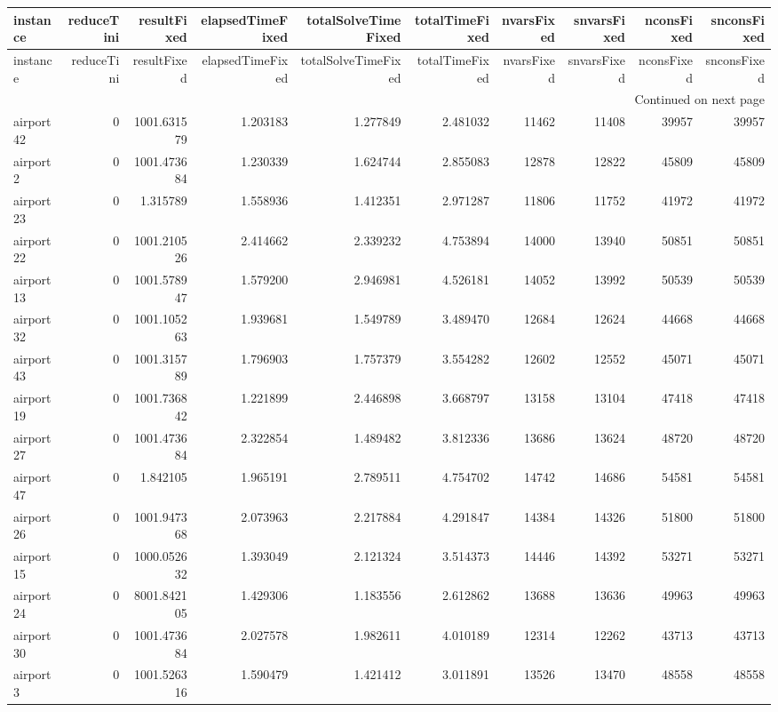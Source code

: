 \begin{longtable}{|l|r|r|r|r|r|r|r|r|r|}
\toprule
instance & reduceTini & resultFixed & elapsedTimeFixed & totalSolveTimeFixed & totalTimeFixed & nvarsFixed & snvarsFixed & nconsFixed & snconsFixed \\
\midrule
\endfirsthead
\toprule
instance & reduceTini & resultFixed & elapsedTimeFixed & totalSolveTimeFixed & totalTimeFixed & nvarsFixed & snvarsFixed & nconsFixed & snconsFixed \\
\midrule
\endhead
\midrule
\multicolumn{10}{r}{Continued on next page} \\
\midrule
\endfoot
\bottomrule
\endlastfoot
airport42 & 0 & 1001.631579 & 1.203183 & 1.277849 & 2.481032 & 11462 & 11408 & 39957 & 39957 \\
airport2 & 0 & 1001.473684 & 1.230339 & 1.624744 & 2.855083 & 12878 & 12822 & 45809 & 45809 \\
airport23 & 0 & 1.315789 & 1.558936 & 1.412351 & 2.971287 & 11806 & 11752 & 41972 & 41972 \\
airport22 & 0 & 1001.210526 & 2.414662 & 2.339232 & 4.753894 & 14000 & 13940 & 50851 & 50851 \\
airport13 & 0 & 1001.578947 & 1.579200 & 2.946981 & 4.526181 & 14052 & 13992 & 50539 & 50539 \\
airport32 & 0 & 1001.105263 & 1.939681 & 1.549789 & 3.489470 & 12684 & 12624 & 44668 & 44668 \\
airport43 & 0 & 1001.315789 & 1.796903 & 1.757379 & 3.554282 & 12602 & 12552 & 45071 & 45071 \\
airport19 & 0 & 1001.736842 & 1.221899 & 2.446898 & 3.668797 & 13158 & 13104 & 47418 & 47418 \\
airport27 & 0 & 1001.473684 & 2.322854 & 1.489482 & 3.812336 & 13686 & 13624 & 48720 & 48720 \\
airport47 & 0 & 1.842105 & 1.965191 & 2.789511 & 4.754702 & 14742 & 14686 & 54581 & 54581 \\
airport26 & 0 & 1001.947368 & 2.073963 & 2.217884 & 4.291847 & 14384 & 14326 & 51800 & 51800 \\
airport15 & 0 & 1000.052632 & 1.393049 & 2.121324 & 3.514373 & 14446 & 14392 & 53271 & 53271 \\
airport24 & 0 & 8001.842105 & 1.429306 & 1.183556 & 2.612862 & 13688 & 13636 & 49963 & 49963 \\
airport30 & 0 & 1001.473684 & 2.027578 & 1.982611 & 4.010189 & 12314 & 12262 & 43713 & 43713 \\
airport3 & 0 & 1001.526316 & 1.590479 & 1.421412 & 3.011891 & 13526 & 13470 & 48558 & 48558 \\

\end{longtable}
